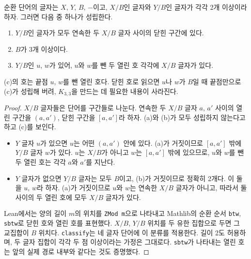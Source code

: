 \begin{lemma}[순환 단어]
\label{lem:cyclic}
\leanok
순환 단어의 글자는 \(X\), \(Y\), \(B\), \(-\)이고, \(X/B\)인 글자와 \(Y/B\)인 글자가 각각 2개 이상이라
하자. 그러면 다음 중 하나가 성립한다.
\begin{enumerate}
  \item[(a)] \(Y/B\)인 글자가 모두 연속한 두 \(X/B\) 글자 사이의 닫힌 구간에 있다.
  \item[(b)] \(B\)가 3개 이상이다.
  \item[(c)] \(Y/B\)인 \(u\), \(w\)가 있어, \(u\)와 \(w\)를 뺀 두 열린 호 각각에 \(X/B\) 글자가 있다.
\end{enumerate}
(c)의 호는 끝점 \(u\), \(w\)를 뺀 열린 호다. 닫힌 호로 읽으면 \(u\)나 \(w\)가 \(B\)일 때 끝점만으로 (c)가
성립해 버려, \(K_{3,3}\)을 만드는 데 필요한 내용이 사라진다.
\end{lemma}

\begin{proof}
\leanok
\(X/B\) 글자들은 단어를 구간들로 나눈다. 연속한 두 \(X/B\) 글자 \(a\), \(a'\) 사이의 열린 구간을 \((a, a')\),
닫힌 구간을 \([a, a']\)라 하자. (a)와 (b)가 모두 성립하지 않는다고 하고 (c)를 보인다.
\begin{itemize}
  \item \(Y\) 글자 \(u\)가 있으면 \(u\)는 어떤 \((a, a')\) 안에 있다. (a)가 거짓이므로 \([a, a']\) 밖에 \(Y/B\)
        글자 \(w\)가 있다. \(u\)는 \(X/B\)가 아니고 \(w\)는 \([a, a']\) 밖에 있으므로, \(u\)와 \(w\)를 뺀 두 열린
        호는 각각 \(a\)와 \(a'\)를 지난다.
  \item \(Y\) 글자가 없으면 \(Y/B\) 글자는 모두 \(B\)이고, (b)가 거짓이므로 정확히 2개다. 이 둘을 \(u\), \(w\)라
        하자. (a)가 거짓이므로 \(u\)와 \(w\)는 연속한 \(X/B\) 글자가 아니고, 따라서 둘 사이의 두 열린 호에 모두
        \(X/B\) 글자가 있다.
\end{itemize}
Lean에서는 양의 길이 \(m\)의 위치를 \texttt{ZMod m}으로 나타내고 Mathlib의 순환 순서
\texttt{btw}, \texttt{sbtw}로 닫힌 호와 열린 호를 표현했다. \(X/B\), \(Y/B\) 위치를 두 유한 집합으로
두면 그 교집합이 \(B\) 위치다. \texttt{classify}는 네 글자 단어에 이 분류를 적용한다.
길이 2도 허용하며, 두 글자 집합이 각각 두 점 이상이라는 가정은 그대로다.
\texttt{sbtw}가 나타내는 열린 호는 앞의 실제 경로 내부와 같다는 것도 증명했다.
\end{proof}

